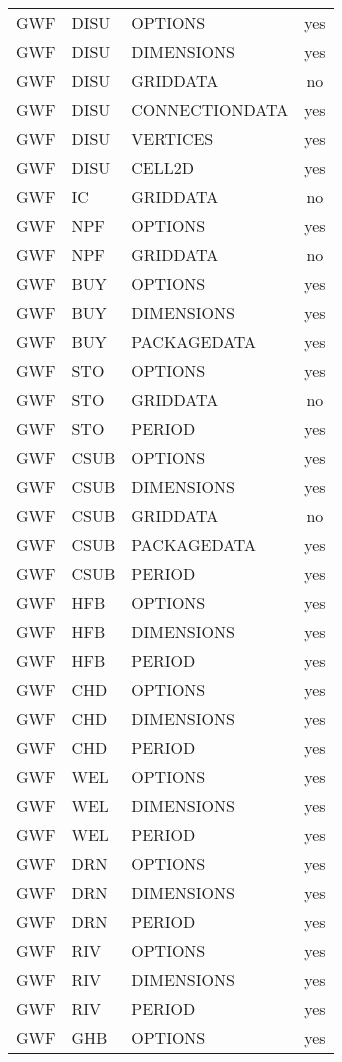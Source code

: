 \begin{longtable}{p{1.5cm} p{1.5cm} p{3cm} c}
\hline
GWF & DISU & OPTIONS & yes \\ 
GWF & DISU & DIMENSIONS & yes \\ 
GWF & DISU & GRIDDATA & no \\ 
GWF & DISU & CONNECTIONDATA & yes \\ 
GWF & DISU & VERTICES & yes \\ 
GWF & DISU & CELL2D & yes \\ 
\hline
GWF & IC & GRIDDATA & no \\ 
\hline
GWF & NPF & OPTIONS & yes \\ 
GWF & NPF & GRIDDATA & no \\ 
\hline
GWF & BUY & OPTIONS & yes \\ 
GWF & BUY & DIMENSIONS & yes \\ 
GWF & BUY & PACKAGEDATA & yes \\ 
\hline
GWF & STO & OPTIONS & yes \\ 
GWF & STO & GRIDDATA & no \\ 
GWF & STO & PERIOD & yes \\ 
\hline
GWF & CSUB & OPTIONS & yes \\ 
GWF & CSUB & DIMENSIONS & yes \\ 
GWF & CSUB & GRIDDATA & no \\ 
GWF & CSUB & PACKAGEDATA & yes \\ 
GWF & CSUB & PERIOD & yes \\ 
\hline
GWF & HFB & OPTIONS & yes \\ 
GWF & HFB & DIMENSIONS & yes \\ 
GWF & HFB & PERIOD & yes \\ 
\hline
GWF & CHD & OPTIONS & yes \\ 
GWF & CHD & DIMENSIONS & yes \\ 
GWF & CHD & PERIOD & yes \\ 
\hline
GWF & WEL & OPTIONS & yes \\ 
GWF & WEL & DIMENSIONS & yes \\ 
GWF & WEL & PERIOD & yes \\ 
\hline
GWF & DRN & OPTIONS & yes \\ 
GWF & DRN & DIMENSIONS & yes \\ 
GWF & DRN & PERIOD & yes \\ 
\hline
GWF & RIV & OPTIONS & yes \\ 
GWF & RIV & DIMENSIONS & yes \\ 
GWF & RIV & PERIOD & yes \\ 
\hline
GWF & GHB & OPTIONS & yes \\ 

\end{longtable}
